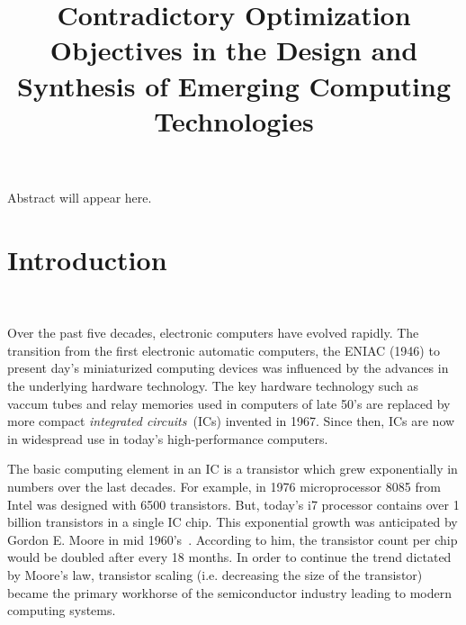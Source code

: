 \documentclass[10pt,letterpaper,twoside,openright]{book}
\begin{document}
\title{Contradictory Optimization Objectives in the Design and Synthesis of Emerging Computing Technologies}

\tableofcontents

\author{}

\date{}

\maketitle

Abstract will appear here.
\chapter{Introduction}~\label{ch:intro}

Over the past five decades, electronic computers have evolved rapidly. The transition from the first electronic automatic computers, the ENIAC (1946) to present day's miniaturized computing devices was influenced by the advances in the underlying hardware technology. The key hardware technology such as vaccum tubes and relay memories used in computers of late 50's are replaced by more compact {\em integrated circuits}~(ICs) invented in 1967. Since then, ICs are now in widespread use in today's high-performance computers.

The basic computing element in an IC is a transistor which grew exponentially in numbers over the last decades. For example, in 1976 microprocessor 8085 from Intel was designed with 6500 transistors. But, today's i7 processor contains over 1 billion transistors in a single IC chip. This exponential growth was anticipated by Gordon E. Moore in mid 1960's~\cite{Moore1965}. According to him, the transistor count per chip would be doubled after every 18 months. In order to continue the trend dictated by Moore's law, transistor scaling (i.e. decreasing the size of the transistor) became the primary workhorse of the semiconductor industry leading to modern computing systems.
\end{document}
